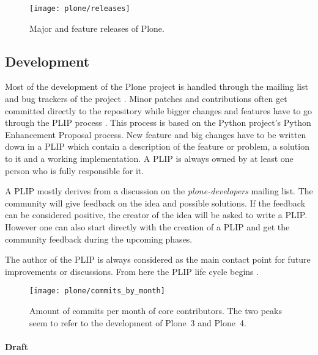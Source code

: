 \begin{figure}[htbp]
  \centering
  \texttt{[image: plone/releases]}
  \caption[Major releases of Plone]{Major and feature releases of Plone.}
\end{figure}


\subsection{Development} %

Most of the development of the Plone project is handled through the mailing
list and bug trackers of the project
\cite{PloneContribute,PloneCommunityProcesses}. Minor patches and contributions
often get committed directly to the repository while bigger changes and
features have to go through the \ac{PLIP} process
\cite{PlonePLIPProcess,PloneCommunityProcesses,PlonePLIPLifecycle}. This
process is based on the Python project's Python Enhancement Proposal process.
New feature and big changes have to be written down in a \ac{PLIP} which
contain a description of the feature or problem, a solution to it and a working
implementation. A \ac{PLIP} is always owned by at least one person who is fully
responsible for it.

A \ac{PLIP} mostly derives from a discussion on the \emph{plone-developers}
mailing list. The community will give feedback on the idea and possible
solutions. If the feedback can be considered positive, the creator of the idea
will be asked to write a \ac{PLIP}. However one can also start directly with
the creation of a \ac{PLIP} and get the community feedback during the upcoming
phases.

The author of the \ac{PLIP} is always considered as the main contact point for
future improvements or discussions. From here the \ac{PLIP} life cycle begins
\cite{PlonePLIPLifecycle}.

\begin{figure}[htbp]
  \centering
  \texttt{[image: plone/commits\_by\_month]}
  \caption[Commits by month, Plone]
  {Amount of commits per month of core contributors. The two peaks seem to
    refer to the development of Plone~3 and Plone~4.}
\end{figure}

\paragraph{Draft}

